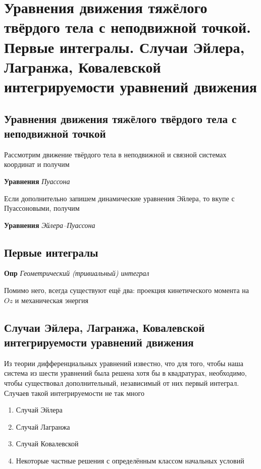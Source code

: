 \documentclass[a4paper, 14pt]{article}
\begin{document}
    \section{Уравнения движения тяжёлого твёрдого тела с неподвижной точкой.
    Первые интегралы.
    Случаи Эйлера, Лагранжа, Ковалевской интегрируемости уравнений движения}
    
    \subsection{Уравнения движения тяжёлого твёрдого тела с неподвижной точкой}
    
    Рассмотрим движение твёрдого тела в неподвижной и связной системах координат и получим
    
    \textbf{Уравнения} \textit{Пуассона}
    
    Если дополнительно запишем динамические уравнения Эйлера, то вкупе с Пуассоновыми, получим
    
    \textbf{Уравнения} \textit{Эйлера--Пуассона}
    
    \subsection{Первые интегралы}
    
    \textbf{Опр} \textit{Геометрический (тривиальный) интеграл}
    
    Помимо него, всегда существуют ещё два: проекция кинетического момента на $Oz$ и механическая энергия
    
    \subsection{Случаи Эйлера, Лагранжа, Ковалевской интегрируемости уравнений движения}

    Из теории дифференциальных уравнений известно, что для того, чтобы наша система из шести уравнений была решена
    хотя бы в квадратурах, необходимо, чтобы существовал дополнительный, независимый от них первый интеграл.
    Случаев такой интегрируемости не так много
    
    \begin{enumerate}
        \item Случай Эйлера
        \item Случай Лагранжа
        \item Случай Ковалевской
        \item Некоторые частные решения с определённым классом начальных условий
    \end{enumerate}
    
\end{document}
